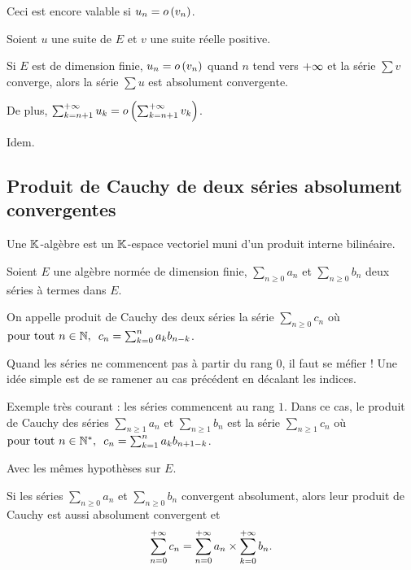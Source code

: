 Ceci est encore valable si \(u_n=o\left(v_n\right)\).

\begin{prop}
Soient \(u\) une suite de \(E\) et \(v\) une suite réelle positive.

Si \(E\) est de dimension finie, \(u_n=o\left(v_n\right)\) quand \(n\) tend vers \(+\infty\) et la série \(\sum v\) converge, alors la série \(\sum u\) est absolument convergente.

De plus, \(\sum_{k=n+1}^{+\infty}u_k=o\left(\sum_{k=n+1}^{+\infty}v_k\right)\).
\end{prop}

\begin{dem}
Idem.
\end{dem}

\subsection{Produit de Cauchy de deux séries absolument convergentes}

\begin{defi}
Une \(\mathbb{K}\)-algèbre est un \(\mathbb{K}\)-espace vectoriel muni d'un produit interne bilinéaire.
\end{defi}

\begin{defi}
Soient \(E\) une algèbre normée de dimension finie, \(\sum_{n\geq0}a_n\) et \(\sum_{n\geq0}b_n\) deux séries à termes dans \(E\).

On appelle produit de Cauchy des deux séries la série \(\sum_{n\geq0}c_n\) où \(\quantifs{\tpt n\in\N}c_n=\sum_{k=0}^na_kb_{n-k}\).
\end{defi}

\begin{rem}
Quand les séries ne commencent pas à partir du rang \(0\), il faut se méfier ! Une idée simple est de se ramener au cas précédent en décalant les indices.

Exemple très courant : les séries commencent au rang \(1\). Dans ce cas, le produit de Cauchy des séries \(\sum_{n\geq1}a_n\) et \(\sum_{n\geq1}b_n\) est la série \(\sum_{n\geq1}c_n\) où \(\quantifs{\tpt n\in\Ns}c_n=\sum_{k=1}^{n}a_kb_{n+1-k}\).
\end{rem}

\begin{theo}
Avec les mêmes hypothèses sur \(E\).

Si les séries \(\sum_{n\geq0}a_n\) et \(\sum_{n\geq0}b_n\) convergent absolument, alors leur produit de Cauchy est aussi absolument convergent et \[\sum_{n=0}^{+\infty}c_n=\sum_{n=0}^{+\infty}a_n\times\sum_{k=0}^{+\infty}b_n.\]
\end{theo}

